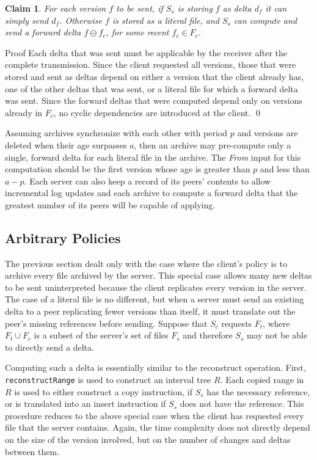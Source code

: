 \documentclass{llncs}
\newtheorem{clm}{{\sc Claim}}
\begin{document}
\begin{clm}
For each version $f$ to be sent, if $S_s$ is storing $f$ as delta
$d_f$ it can simply send $d_f$.  Otherwise $f$ is stored as a literal
file, and $S_s$ can compute and send a forward delta $f \ominus f_c$,
for some recent $f_c \in F_c$.
\end{clm}

{\sc Proof} Each delta that was sent must be applicable by the
receiver after the complete transmission.  Since the client requested
all versions, those that were stored and sent as deltas depend on
either a version that the client already has, one of the other deltas
that was sent, or a literal file for which a forward delta was sent.
Since the forward deltas that were computed depend only on versions
already in $F_c$, no cyclic dependencies are introduced at the
client. \qed

Assuming archives synchronize with each other with period $p$ and
versions are deleted when their age surpasses $a$, then an archive may
pre-compute only a single, forward delta for each literal file in the
archive.  The \emph{From} input for this computation should be the
first version whose age is greater than $p$ and less than $a-p$.  Each
server can also keep a record of its peers' contents to allow
incremental log updates and each archive to compute a forward delta
that the greatest number of its peers will be capable of applying.

\subsection{Arbitrary Policies}

The previous section dealt only with the case where the client's
policy is to archive every file archived by the server.  This special
case allows many new deltas to be sent uninterpreted because the
client replicates every version in the server.  The case of a literal
file is no different, but when a server must send an existing delta to
a peer replicating fewer versions than itself, it must translate out
the peer's missing references before sending.  Suppose that $S_c$
requests $F_t$, where $F_t \cup F_c$ is a subset of the server's set
of files $F_s$ and therefore $S_s$ may not be able to directly send a
delta.

Computing such a delta is essentially similar to the reconstruct
operation.  First, \texttt{reconstructRange} is used to construct an
interval tree $R$.  Each copied range in $R$ is used to either
construct a copy instruction, if $S_s$ has the necessary reference, or
is translated into an insert instruction if $S_s$ does not have the
reference.  This procedure reduces to the above special case when the
client has requested every file that the server contains.  Again, the
time complexity does not directly depend on the size of the version
involved, but on the number of changes and deltas between them.
\end{document}
